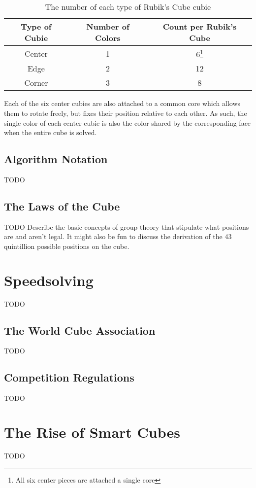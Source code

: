 \begin{table}[h]
    \centering
    \begin{minipage}{10cm}
        \begin{tabular}{ | c | c | c | }
            \hline
            Type of Cubie & Number of Colors & Count per Rubik's Cube \\ 
            \hline \hline
            Center & 1 & 6\footnote[1]{All six center pieces are attached a single core} \\
            \hline
            Edge & 2 & 12 \\  
            \hline
            Corner & 3 & 8 \\
            \hline
        \end{tabular}
    \end{minipage}
    \caption{The number of each type of Rubik's Cube cubie}
    \label{table:cubie-count}
\end{table}

Each of the six center cubies are also attached to a common core which allows them to rotate freely, but fixes their position relative to each other.
As such, the single color of each center cubie is also the color shared by the corresponding face when the entire cube is solved.

\subsection{Algorithm Notation}
TODO

\subsection{The Laws of the Cube}
TODO Describe the basic concepts of group theory that stipulate what positions are and aren't legal. It might also be fun to discuss the derivation of the 43 quintillion possible positions on the cube.


\section{Speedsolving}

TODO

\subsection{The World Cube Association}
TODO

\subsection{Competition Regulations}
TODO


\section{The Rise of Smart Cubes}

TODO